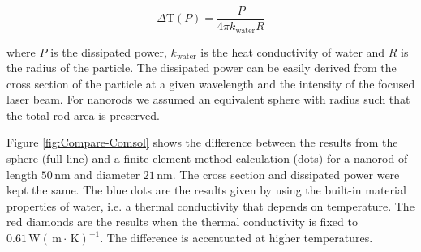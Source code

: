 \documentclass[journal=nalefd,manuscript=letter]{achemso}
\newcommand{\K}{\ensuremath{\,\textrm{K}}}
\newcommand{\nm}{\ensuremath{\,\textrm{nm}}}
\newcommand{\m}{\ensuremath{\,\textrm{m}}}
\newcommand{\W}{\ensuremath{\,\textrm{W}}}
\begin{document}
\begin{equation}
	\Delta \textrm{T}(P) = \frac{P}{4\pi k_{\textrm{water}} R}
\end{equation}

\noindent where $P$ is the dissipated power, $k_{\textrm{water}}$ is the heat
conductivity of water and $R$ is the radius of the particle.\cite{Baffou2013} 
The dissipated power can be
easily derived from the cross section of the particle at a given wavelength and
the intensity of the focused laser beam. For nanorods we assumed an
equivalent sphere with radius such that the total rod area is preserved.

Figure \ref{fig:Compare-Comsol} shows the difference between the results from
the sphere (full line) and a finite element method calculation
(dots) for a nanorod of length $50\nm$ and diameter $21\nm$. The cross section
and dissipated power were kept the same. The blue dots are the results given
by using the built-in material properties of water, i.e. a thermal conductivity
that depends on temperature. The red diamonds are the results when the thermal
conductivity is fixed to $0.61 \W(\m\cdot\K)^{-1}$. The difference is
accentuated at higher temperatures.


 
\end{document}
